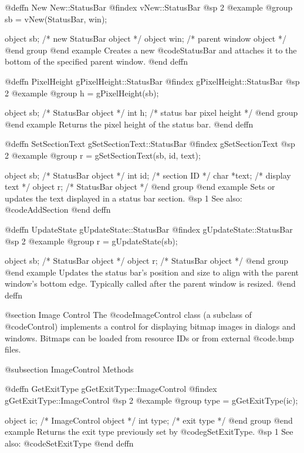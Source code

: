 @deffn {New} New::StatusBar
@findex vNew::StatusBar
@sp 2
@example
@group
sb = vNew(StatusBar, win);

object  sb;    /*  new StatusBar object   */
object  win;   /*  parent window object   */
@end group
@end example
Creates a new @code{StatusBar} and attaches it to the bottom of the
specified parent window.
@end deffn



@deffn {PixelHeight} gPixelHeight::StatusBar
@findex gPixelHeight::StatusBar
@sp 2
@example
@group
h = gPixelHeight(sb);

object  sb;   /*  StatusBar object        */
int     h;    /*  status bar pixel height  */
@end group
@end example
Returns the pixel height of the status bar.
@end deffn



@deffn {SetSectionText} gSetSectionText::StatusBar
@findex gSetSectionText
@sp 2
@example
@group
r = gSetSectionText(sb, id, text);

object  sb;     /*  StatusBar object  */
int     id;     /*  section ID        */
char    *text;  /*  display text      */
object  r;      /*  StatusBar object  */
@end group
@end example
Sets or updates the text displayed in a status bar section.
@sp 1
See also:  @code{AddSection}
@end deffn



@deffn {UpdateState} gUpdateState::StatusBar
@findex gUpdateState::StatusBar
@sp 2
@example
@group
r = gUpdateState(sb);

object  sb;   /*  StatusBar object  */
object  r;    /*  StatusBar object  */
@end group
@end example
Updates the status bar's position and size to align with the parent
window's bottom edge.  Typically called after the parent window is
resized.
@end deffn




@section Image Control
The @code{ImageControl} class (a subclass of @code{Control}) implements
a control for displaying bitmap images in dialogs and windows.  Bitmaps
can be loaded from resource IDs or from external @code{.bmp} files.

@subsection ImageControl Methods



@deffn {GetExitType} gGetExitType::ImageControl
@findex gGetExitType::ImageControl
@sp 2
@example
@group
type = gGetExitType(ic);

object  ic;     /*  ImageControl object  */
int     type;   /*  exit type            */
@end group
@end example
Returns the exit type previously set by @code{gSetExitType}.
@sp 1
See also:  @code{SetExitType}
@end deffn



